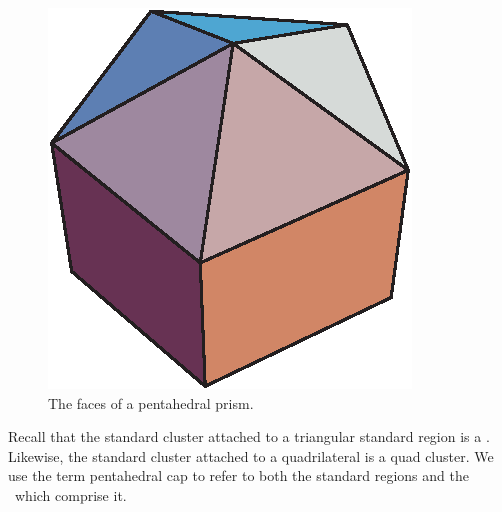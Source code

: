 \begin{figure}
\begin{center}
\includegraphics{PS/pentaface}
\end{center}
\caption{The faces of a pentahedral prism.}
\label{fig:pentaface}
\end{figure}

Recall that the standard cluster attached to a triangular standard region
is a \qrtet.  Likewise, the standard cluster attached to a
quadrilateral is a quad cluster.
We use the term pentahedral cap to refer to
both the standard regions and the \qrtets\ which comprise it.




